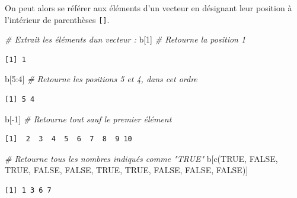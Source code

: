 \documentclass[
  12pt,
]{book}
\newenvironment{Shaded}{\begin{snugshade}}{\end{snugshade}}
\newcommand{\CommentTok}[1]{\textcolor[rgb]{0.56,0.35,0.01}{\textit{#1}}}
\newcommand{\ConstantTok}[1]{\textcolor[rgb]{0.00,0.00,0.00}{#1}}
\newcommand{\DecValTok}[1]{\textcolor[rgb]{0.00,0.00,0.81}{#1}}
\newcommand{\FunctionTok}[1]{\textcolor[rgb]{0.00,0.00,0.00}{#1}}
\newcommand{\NormalTok}[1]{#1}
\newcommand{\SpecialCharTok}[1]{\textcolor[rgb]{0.00,0.00,0.00}{#1}}
\begin{document}
On peut alors se référer aux éléments d'un vecteur en désignant leur position à l'intérieur de parenthèses \texttt{{[}{]}}.

\begin{Shaded}
\begin{Highlighting}[]
\CommentTok{\# Extrait les éléments d\textquotesingle{}un vecteur :}
\NormalTok{b[}\DecValTok{1}\NormalTok{] }\CommentTok{\# Retourne la position 1}
\end{Highlighting}
\end{Shaded}

\begin{verbatim}
[1] 1
\end{verbatim}

\begin{Shaded}
\begin{Highlighting}[]
\NormalTok{b[}\DecValTok{5}\SpecialCharTok{:}\DecValTok{4}\NormalTok{] }\CommentTok{\# Retourne les positions 5 et 4, dans cet ordre}
\end{Highlighting}
\end{Shaded}

\begin{verbatim}
[1] 5 4
\end{verbatim}

\begin{Shaded}
\begin{Highlighting}[]
\NormalTok{b[}\SpecialCharTok{{-}}\DecValTok{1}\NormalTok{] }\CommentTok{\# Retourne tout sauf le premier élément}
\end{Highlighting}
\end{Shaded}

\begin{verbatim}
[1]  2  3  4  5  6  7  8  9 10
\end{verbatim}

\begin{Shaded}
\begin{Highlighting}[]
\CommentTok{\# Retourne tous les nombres indiqués comme "TRUE"}
\NormalTok{b[}\FunctionTok{c}\NormalTok{(}\ConstantTok{TRUE}\NormalTok{, }\ConstantTok{FALSE}\NormalTok{, }\ConstantTok{TRUE}\NormalTok{, }\ConstantTok{FALSE}\NormalTok{, }\ConstantTok{FALSE}\NormalTok{, }\ConstantTok{TRUE}\NormalTok{, }\ConstantTok{TRUE}\NormalTok{, }\ConstantTok{FALSE}\NormalTok{, }\ConstantTok{FALSE}\NormalTok{, }\ConstantTok{FALSE}\NormalTok{)]}
\end{Highlighting}
\end{Shaded}

\begin{verbatim}
[1] 1 3 6 7
\end{verbatim}
\end{document}
